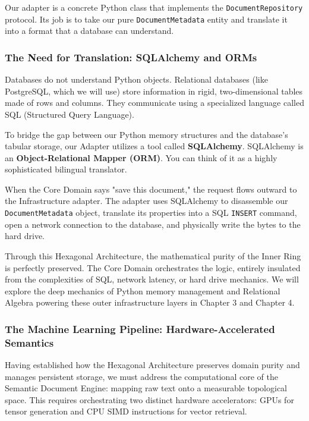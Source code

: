 Our adapter is a concrete Python class that implements the \texttt{Document\allowbreak{}Repository} protocol. Its job is to take our pure \texttt{DocumentMetadata} entity and translate it into a format that a database can understand.

\subsubsection*{The Need for Translation: SQLAlchemy and ORMs}

Databases do not understand Python objects. Relational databases (like PostgreSQL, which we will use) store information in rigid, two-dimensional tables made of rows and columns. They communicate using a specialized language called SQL (Structured Query Language).

To bridge the gap between our Python memory structures and the database's tabular storage, our Adapter utilizes a tool called \textbf{SQLAlchemy}. SQLAlchemy is an \textbf{Object-Relational Mapper (ORM)}. You can think of it as a highly sophisticated bilingual translator.

When the Core Domain says "save this document," the request flows outward to the Infrastructure adapter. The adapter uses SQLAlchemy to disassemble our \texttt{DocumentMetadata} object, translate its properties into a SQL \texttt{INSERT} command, open a network connection to the database, and physically write the bytes to the hard drive.

Through this Hexagonal Architecture, the mathematical purity of the Inner Ring is perfectly preserved. The Core Domain orchestrates the logic, entirely insulated from the complexities of SQL, network latency, or hard drive mechanics. We will explore the deep mechanics of Python memory management and Relational Algebra powering these outer infrastructure layers in Chapter 3 and Chapter 4.

\subsubsection*{The Machine Learning Pipeline: Hardware-Accelerated Semantics}

Having established how the Hexagonal Architecture preserves domain purity and manages persistent storage, we must address the computational core of the Semantic Document Engine: mapping raw text onto a measurable topological space. This requires orchestrating two distinct hardware accelerators: GPUs for tensor generation and CPU SIMD instructions for vector retrieval.

